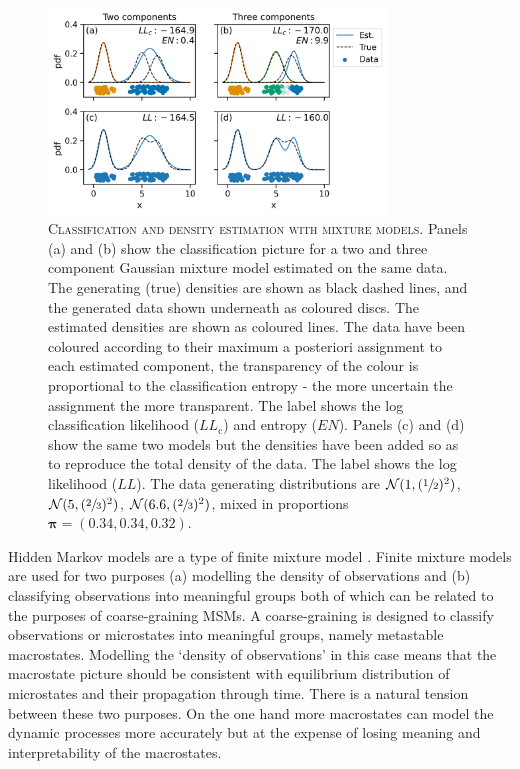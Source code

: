 \begin{figure}
    \centering
    \includegraphics[width=0.8\textwidth]{chapters/hmm_selection/figures/class_like_explainer.png}
    \caption[Classification and density estimation with mixture models]{\textsc{Classification and density estimation with mixture models}. Panels (a) and (b) show the classification picture for a two and three component Gaussian mixture model estimated on the same data. The generating (true) densities are shown as black dashed lines, and the generated data shown underneath as coloured discs. The estimated densities are shown as coloured lines. The data have been coloured according to their maximum a posteriori assignment to each estimated component, the transparency of the colour is proportional to the classification entropy - the more uncertain the assignment the more transparent. The label shows the log classification likelihood ($LL_{\mathrm{c}}$) and entropy ($EN$). Panels (c) and (d) show the same two models but the densities have been added so as to reproduce the total density of the data. The label shows the log likelihood ($LL$). The data generating distributions are $\mathcal{N}(1, (\sfrac{1}{2})^{2})$, $\mathcal{N}(5, (\sfrac{2}{3})^{2})$, $\mathcal{N}(6.6, (\sfrac{2}{3})^{2})$, mixed in proportions $\bm{\pi}=(0.34, 0.34, 0.32)$.}
    \label{fig:hmm_class_lik_explainer}
\end{figure}

Hidden Markov models are a type of finite mixture model \cite{mclachlanFiniteMixtureModels2000}. Finite mixture models are used for two purposes (a) modelling the density of observations and (b) classifying observations into meaningful groups \cite{mclachlan1988mixture} both of which can be related to the purposes of coarse-graining MSMs. A coarse-graining is designed to classify observations or microstates into meaningful groups, namely metastable macrostates.  Modelling the `density of observations' in this case means that the macrostate picture should be consistent with equilibrium distribution of microstates and their propagation through time. There is a natural tension between these two purposes.  On the one hand more macrostates can model the dynamic processes more accurately but at the expense of losing meaning and interpretability of the macrostates.  

